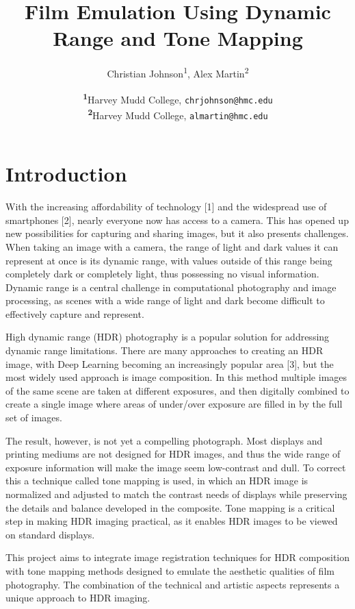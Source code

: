 \documentclass[
	a4paper, %
	10pt, %
	unnumberedsections, %
	twoside, %
]{LTJournalArticle}
\title{Film Emulation Using Dynamic Range and Tone Mapping} %
\author{%
	Christian Johnson\textsuperscript{1}, Alex Martin\textsuperscript{2} 
}
\date{\footnotesize\textsuperscript{\textbf{1}}Harvey Mudd College, \texttt{chrjohnson@hmc.edu} \\ \textsuperscript{\textbf{2}}Harvey Mudd College, \texttt{almartin@hmc.edu}}
\begin{document}
\maketitle %


\section{Introduction}

With the increasing affordability of technology [1] and the widespread use of smartphones [2], nearly everyone now has access to a camera. This has opened up new possibilities for capturing and sharing images, but it also presents challenges. When taking an image with a camera, the range of light and dark values it can represent at once is its dynamic range, with values outside of this range being completely dark or completely light, thus possessing no visual information. Dynamic range is a central challenge in computational photography and image processing, as scenes with a wide range of light and dark become difficult to effectively capture and represent. 

High dynamic range (HDR) photography is a popular solution for addressing dynamic range limitations. There are many approaches to creating an HDR image, with Deep Learning becoming an increasingly popular area [3], but the most widely used approach is image composition. In this method multiple images of the same scene are taken at different exposures, and then digitally combined to create a single image where areas of under/over exposure are filled in by the full set of images.

The result, however, is not yet a compelling photograph. Most displays and printing mediums are not designed for HDR images, and thus the wide range of exposure information will make the image seem low-contrast and dull. To correct this a technique called tone mapping is used, in which an HDR image is normalized and adjusted to match the contrast needs of displays while preserving the details and balance developed in the composite. Tone mapping is a critical step in making HDR imaging practical, as it enables HDR images to be viewed on standard displays. 

This project aims to integrate image registration techniques for HDR composition with tone mapping methods designed to emulate the aesthetic qualities of film photography. The combination of the technical and artistic aspects represents a unique approach to HDR imaging. 
\end{document}

